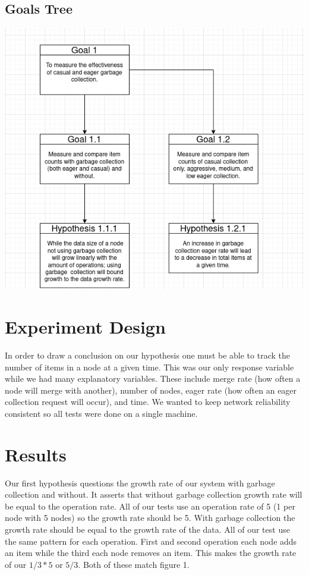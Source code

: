 \documentclass{article}
\begin{document}
\begin{multicols}{2}
\begin{refsection}
\subsection*{Goals Tree}

\includegraphics[width=\columnwidth]{GoalTree}

\section*{Experiment Design}

In order to draw a conclusion on our hypothesis one must be able to
track the number of items in a node at a given time. This was our only
response variable while we had many explanatory variables. These include
merge rate (how often a node will merge with another), number of nodes,
eager rate (how often an eager collection request will occur), and time.
We wanted to keep network reliability consistent so all tests were done
on a single machine.

\section*{Results}

Our first hypothesis questions the growth rate of our system with garbage
collection and without. It asserts that without garbage collection
growth rate will be equal to the operation rate. All of our tests use
an operation rate of 5 (1 per node with 5 nodes) so the growth rate
should be 5. With garbage collection the growth rate should be equal to
the growth rate of the data. All of our test use the same pattern for
each operation. First and second operation each node adds an item while
the third each node removes an item. This makes the growth rate of our
$1/3 * 5$ or $5/3$. Both of these match figure 1.



\end{refsection}
\end{multicols}
\end{document}
